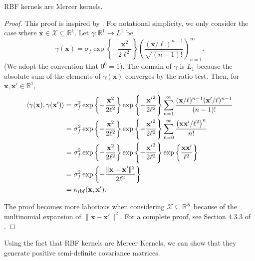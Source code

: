 \begin{theorem}
    \label{thm:rbf-mercer}
    RBF kernels are Mercer kernels.
\end{theorem}
\begin{proof}
    This proof is inspired by \cite{shashua2009}.
    For notational simplicity, we only consider the case where $\mathbf{x} \in \mathcal{X} \subseteq \mathbb{R}^{1}$.
    Let $\gamma : \mathbb{R}^{1} \to L^1$ be
    \begin{equation*}
        \gamma(\mathbf{x}) = \sigma_f \exp\left\{- \frac{\mathbf{x}^2}{2\ell^2}\right\} \left(\frac{ (\mathbf{x} / \ell)^{n - 1} }{ \sqrt{(n - 1)!} }\right)_{n=1}^{\infty}.
    \end{equation*}
    (We adopt the convention that $0^0 = 1$).
    The domain of $\gamma$ is $L_1$ because the absolute sum of the elements of $\gamma(\mathbf{x})$ converges by the ratio test.
    Then, for $\mathbf{x}, \mathbf{x'} \in \mathbb{R}^{1}$,
    \begin{align*}
        \langle \gamma(\mathbf{x}), \gamma(\mathbf{x'}) \rangle
        & = \sigma_f^2
        \exp \left\{ -\frac{\mathbf{x}^2}{2\ell^2} \right\}
        \exp \left\{ -\frac{ \mathbf{x'}^2}{2\ell^2} \right\}
        \sum\limits_{n=1}^{\infty}
        \frac{ (\mathbf{x}/\ell)^{n - 1} (\mathbf{x'}/\ell)^{n - 1}}{ (n - 1)! } \\
        & = \sigma_f^2
        \exp \left\{ -\frac{\mathbf{x}^2}{2\ell^2} \right\}
        \exp \left\{ -\frac{ \mathbf{x'}^2}{2\ell^2} \right\}
        \sum\limits_{n=0}^{\infty}
        \frac{ \left(\mathbf{x}\mathbf{x'}/\ell^2\right)^{n }}{ n ! } \\
        & = \sigma_f^2
        \exp \left\{ -\frac{ \mathbf{x}^2}{2\ell^2} \right\}
        \exp \left\{ -\frac{ \mathbf{x'}^2}{2\ell^2} \right\}
        \exp \left\{ \frac{\mathbf{x} \mathbf{x'}}{ \ell^2} \right\} \\
        & = \sigma_f^2 \exp \left\{ -\frac{ \lVert \mathbf{x} - \mathbf{x'} \rVert^2 }{ 2\ell^2 } \right\} \\
        & = \kappa_{\mathrm{rbf}}(\mathbf{x}, \mathbf{x'}).
    \end{align*}

    The proof becomes more laborious when considering $\mathcal{X} \subseteq \mathbb{R}^{K}$ because of the multinomial expansion of $\lVert \mathbf{x} - \mathbf{x}' \rVert^2$.
    For a complete proof, see Section 4.3.3 of \cite{shashua2009}.
\end{proof}

Using the fact that RBF kernels are Mercer Kernels, we can show that they generate positive semi-definite covariance matrices.


